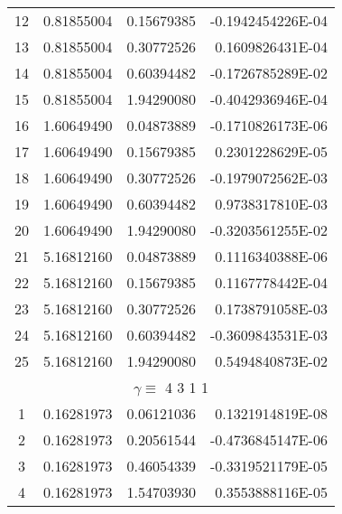 \begin{longtable}{@{\extracolsep{\fill}}cllr@{}}
12  &  0.81855004  &  0.15679385  &  -0.1942454226E-04 \\

13  &  0.81855004  &  0.30772526  &   0.1609826431E-04 \\

14  &  0.81855004  &  0.60394482  &  -0.1726785289E-02 \\

15  &  0.81855004  &  1.94290080  &  -0.4042936946E-04 \\

16  &  1.60649490  &  0.04873889  &  -0.1710826173E-06 \\

17  &  1.60649490  &  0.15679385  &   0.2301228629E-05 \\

18  &  1.60649490  &  0.30772526  &  -0.1979072562E-03 \\

19  &  1.60649490  &  0.60394482  &   0.9738317810E-03 \\

20  &  1.60649490  &  1.94290080  &  -0.3203561255E-02 \\

21  &  5.16812160  &  0.04873889  &   0.1116340388E-06 \\

22  &  5.16812160  &  0.15679385  &   0.1167778442E-04 \\

23  &  5.16812160  &  0.30772526  &   0.1738791058E-03 \\

24  &  5.16812160  &  0.60394482  &  -0.3609843531E-03 \\

25  &  5.16812160  &  1.94290080  &   0.5494840873E-02 \\

\midrule

\multicolumn{4}{c}{ $\gamma \equiv $  4 3 1 1} \\

\midrule

1  &  0.16281973  &  0.06121036  &   0.1321914819E-08 \\

2  &  0.16281973  &  0.20561544  &  -0.4736845147E-06 \\

3  &  0.16281973  &  0.46054339  &  -0.3319521179E-05 \\

4  &  0.16281973  &  1.54703930  &   0.3553888116E-05 \\


\end{longtable}

